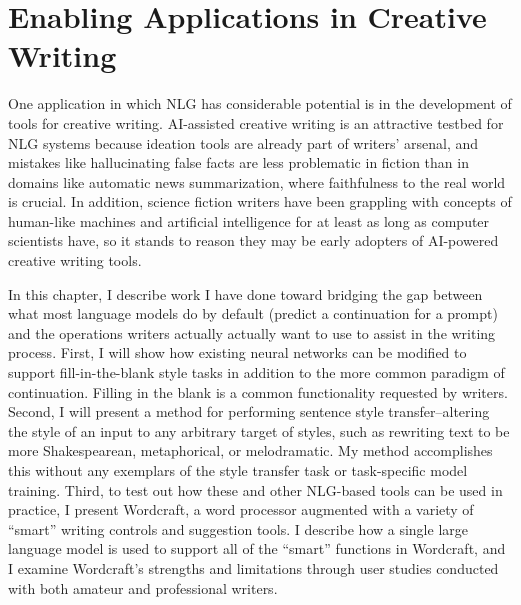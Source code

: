 \chapter{Enabling Applications in Creative Writing}
\label{chap:creativity}
One application in which NLG has considerable potential is in the development of tools for creative writing.
AI-assisted creative writing is an attractive testbed for NLG systems because ideation tools are already part of writers' arsenal, and mistakes like hallucinating false facts are less problematic in fiction than in domains like automatic news summarization, where faithfulness to the real world is crucial.
In addition, science fiction writers have been grappling with concepts of human-like machines and artificial intelligence for at least as long as computer scientists have, so it stands to reason they may be early adopters of AI-powered creative writing tools.

In this chapter, I describe work I have done toward bridging the gap between what most language models do by default (predict a continuation for a prompt) and the operations writers actually actually want to use to assist in the writing process.
First, I will show how existing neural networks can be modified to support fill-in-the-blank style tasks in addition to the more common paradigm of continuation.
Filling in the blank is a common functionality requested by writers.
Second, I will present a method for performing sentence style transfer--altering the style of an input to any arbitrary target of styles, such as rewriting text to be more Shakespearean, metaphorical, or melodramatic.
My method accomplishes this without any exemplars of the style transfer task or task-specific model training.
Third, to test out how these and other NLG-based tools can be used in practice, I present Wordcraft, a word processor augmented with a variety of ``smart'' writing controls and suggestion tools.
I describe how a single large language model is used to support all of the ``smart'' functions in Wordcraft, and I examine Wordcraft's strengths and limitations through user studies conducted with both amateur and professional writers.




